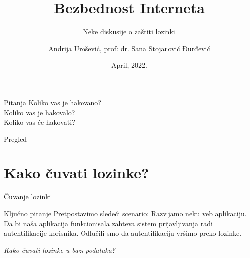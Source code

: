 \documentclass[aspectratio=169,xcolor=dvipsnames]{beamer}
\title[short title]{Bezbednost Interneta}
\subtitle{Neke diskusije o zaštiti lozinki}
\author[Andrija] {Andrija Urošević, prof: dr. Sana Stojanović Đurđević}
\institute[MATF]{
Računarstvo i društvo\\
Univerzitet u Beogradu\\
Matematički fakultet
}
\date{April, 2022.}
\begin{document}

\begin{frame}
    \titlepage
\end{frame}


\begin{frame}{Pitanja}
    \centering
    Koliko vas je hakovano?\\ \vspace{1em}
    Koliko vas je hakovalo?\\ \vspace{1em}
    Koliko vas će hakovati?
\end{frame}


\begin{frame}{Pregled}
    \tableofcontents
\end{frame}

\section{Kako čuvati lozinke?}

\begin{frame}{Čuvanje lozinki}

    \begin{alertblock}{Ključno pitanje}
        Pretpostavimo sledeći scenario: Razvijamo neku veb aplikaciju. Da bi
        naša aplikacija funkcionisala zahteva sistem prijavljivanja radi
        autentifikacije korisnika. Odlučili smo da autentifikaciju vršimo
        preko lozinke.

        \vspace{1em}

        \textit{Kako čuvati lozinke u bazi podataka?}
    \end{alertblock}

\end{frame}

\end{document}
